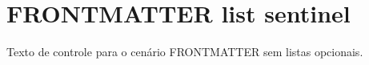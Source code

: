 \documentclass{abntexto-ufc}
\begin{document}
\pretextual

\textual
\section{FRONTMATTER list sentinel}
Texto de controle para o cenário FRONTMATTER sem listas opcionais.
\end{document}
